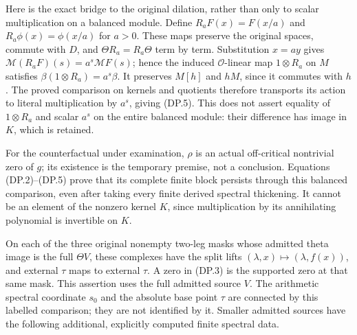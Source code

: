 Here is the exact bridge to the original dilation, rather than only
to scalar multiplication on a balanced module. Define
$R_aF(x)=F(x/a)$ and $R_a\phi(x)=\phi(x/a)$ for $a>0$.
These maps preserve the original spaces, commute with $D$, and
$\Theta R_a=R_a\Theta$ term by term. Substitution $x=ay$ gives
$\mathcal M(R_aF)(s)=a^s\mathcal MF(s)$; hence the induced
$\mathscr O$-linear map $1\otimes R_a$ on $M$ satisfies
$\beta(1\otimes R_a)=a^s\beta$. It preserves $M[h]$ and $hM$,
since it commutes with $h$. The proved comparison on kernels and
quotients therefore transports its action to literal multiplication
by $a^s$, giving (DP.5). This does not assert equality of
$1\otimes R_a$ and scalar $a^s$ on the entire balanced module:
their difference has image in $K$, which is retained.

For the counterfactual under examination, $\rho$ is an actual
off-critical nontrivial zero of $g$; its existence is the temporary
premise, not a conclusion. Equations (DP.2)--(DP.5) prove that its
complete finite block persists through this balanced comparison,
even after taking every finite derived spectral thickening. It
cannot be an element of the nonzero kernel $K$, since multiplication
by its annihilating polynomial is invertible on $K$.

On each of the three original nonempty two-leg masks whose admitted
theta image is the full $\Theta V$, these complexes have the split
lifts $(\lambda,x)\mapsto(\lambda,f(x))$, and external $\tau$ maps
to external $\tau$. A zero in (DP.3) is the supported zero at that
same mask. This assertion uses the full admitted source $V$. The
arithmetic spectral coordinate $s_0$ and the absolute base point
$\tau$ are connected by this labelled comparison; they are not
identified by it. Smaller admitted sources have the following
additional, explicitly computed finite spectral data.

